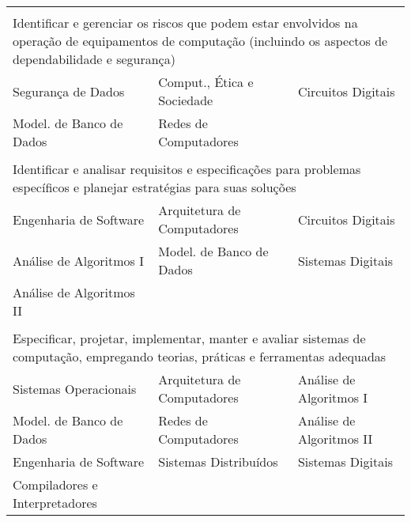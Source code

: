 \begin{longtable}{|p{}p{}p{}|}
    \multicolumn{3}{p{0.95\textwidth}}{}\\
    \multicolumn{3}{p{0.95\textwidth}}{Identificar e gerenciar os riscos que podem
    estar envolvidos na operação de equipamentos de computação (incluindo os
    aspectos de dependabilidade e segurança)}\\
    \hline
    \textcolor{nblue}{Segurança de Dados} &
    \textcolor{nblue}{Comput., Ética e Sociedade} &
    \textcolor{nblue}{Circuitos Digitais}\\
    \textcolor{nblue}{\small Model. de Banco de Dados} &
    \textcolor{nblue}{Redes de Computadores} & \\
    \hline
    
    \multicolumn{3}{p{0.95\textwidth}}{}\\
    \multicolumn{3}{p{0.95\textwidth}}{Identificar e analisar requisitos e
    especificações para problemas específicos e planejar estratégias para suas
    soluções}\\
    \hline
    \textcolor{nblue}{Engenharia de Software} &
    \textcolor{nblue}{Arquitetura de Computadores} &
    \textcolor{nblue}{Circuitos Digitais} \\
    \textcolor{nblue}{Análise de Algoritmos I} &
    \textcolor{nblue}{\small Model. de Banco de Dados} &
    \textcolor{nblue}{Sistemas Digitais} \\
    \textcolor{nblue}{Análise de Algoritmos II} & & \\
    \hline
    
    \multicolumn{3}{p{0.95\textwidth}}{}\\
    \multicolumn{3}{p{0.95\textwidth}}{Especificar, projetar, implementar, manter e
    avaliar sistemas de computação, empregando teorias, práticas e ferramentas
    adequadas}\\
    \hline
    \textcolor{nblue}{Sistemas Operacionais} &
    \textcolor{nblue}{Arquitetura de Computadores} &
    \textcolor{nblue}{Análise de Algoritmos I} \\
    \textcolor{nblue}{\small Model. de Banco de Dados} &
    \textcolor{nblue}{Redes de Computadores} &
    \textcolor{nblue}{Análise de Algoritmos II} \\
    \textcolor{nblue}{Engenharia de Software} &
    \textcolor{nblue}{Sistemas Distribuídos} &
    \textcolor{nblue}{Sistemas Digitais}\\
    \textcolor{nblue}{Compiladores e Interpretadores} & & \\
    \hline
    

\end{longtable}
